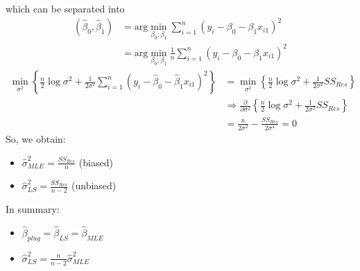 \documentclass{article}
\newcommand{\argmin}{\text{arg}\min}
\newcommand{\sumiton}{\sum_{i=1}^n}
\newcommand{\betahat}{\hat{\beta}}
\begin{document}
which can be separated into
\begin{align}
    (\betahat_0,\betahat_1) &= \argmin_{\beta_0,\beta_1} \sumiton (y_i - \beta_0 - \beta_1x_{i1})^2\\
    &= \argmin_{\beta_0,\beta_1} \frac{1}{n}\sumiton (y_i - \beta_0 - \beta_1x_{i1})^2
\end{align}
\begin{align}
    \min_{\sigma^2} \left\{\frac{n}{2}\log\sigma^2 + \frac{1}{2\sigma^2}\sumiton(y_i - \betahat_0-\betahat_1x_{i1})^2\right\} &= \min_{\sigma^2} \left\{\frac{n}{2}\log\sigma^2 + \frac{1}{2\sigma^2}SS_{Res}\right\}\\
    &\Rightarrow \frac{\partial}{\partial \sigma^2}\left\{\frac{n}{2}\log\sigma^2 + \frac{1}{2\sigma^2}SS_{Res}\right\}\\ 
    &= \frac{n}{2\sigma^2} - \frac{SS_{Res}}{2\sigma^4} = 0
\end{align}
So, we obtain:
\begin{itemize}
    \item $\hat{\sigma}^2_{MLE} = \frac{SS_{Res}}{n}$ (biased)
    \item $\hat{\sigma}^2_{LS} = \frac{SS_{Res}}{n-2}$ (unbiased)
\end{itemize}
In summary:
\begin{itemize}
    \item $\betahat_{plug} = \betahat_{LS} = \betahat_{MLE}$
    \item $\hat{\sigma}^2_{LS} = \frac{n}{n-2}\hat{\sigma}^2_{MLE}$
\end{itemize}
\end{document}
